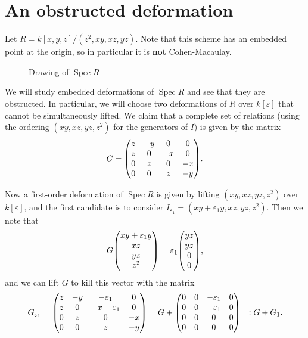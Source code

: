 \documentclass[leqno, openany]{memoir}
\theoremstyle{definition}
\theoremstyle{remark}
\theoremstyle{plain}
\theoremstyle{definition}
\theoremstyle{remark}
\newcommand{\ep}{\varepsilon}
\DeclareMathOperator{\Spec}{Spec}
\begin{document}
\section{An obstructed deformation}%
\label{sec:an_obstructed_deformation}

Let $R = k[x,y,z]/(z^2, xy, xz, yz)$. Note that this scheme has an embedded point at the origin, so in particular it is \textbf{not} Cohen-Macaulay.

\begin{figure}[H]
\begin{center}
\end{center}
\caption{Drawing of $\Spec R$}%
\label{fig:}
\end{figure}

We will study embedded deformations of $\Spec R$ and see that they are obstructed. In particular, we will choose two deformations of $R$ over $k[\ep]$ that cannot be simultaneously lifted. We claim that a complete set of relations (using the ordering $(xy, xz, yz, z^2)$ for the generators of $I$) is given by the matrix
\[ G = \mqty(z & -y & 0 & 0 \\ z & 0 & -x & 0 \\ 0 & z & 0 & -x \\ 0 & 0 & z & -y). \]

Now a first-order deformation of $\Spec R$ is given by lifting $(xy,xz,yz,z^2)$ over $k[\ep]$, and the first candidate is to consider $I_{\ep_1} = (xy + \ep_1 y, xz, yz, z^2)$. Then we note that
\[ G \mqty(xy+\ep_1 y \\ xz \\ yz \\ z^2) = \ep_1 \mqty(yz \\ yz \\ 0 \\ 0), \]
and we can lift $G$ to kill this vector with the matrix
\[ G_{\ep_1} = \mqty(z & -y & -\ep_1 & 0 \\ z & 0 & -x-\ep_1 & 0 \\ 0 & z & 0 & -x \\ 0 & 0 & z & -y) = G + \mqty(0 & 0 & -\ep_1 & 0 \\ 0 & 0 & -\ep_1 & 0 \\ 0 & 0 & 0 & 0 \\ 0 & 0 & 0 & 0) \eqqcolon G + G_1. \]
\end{document}
